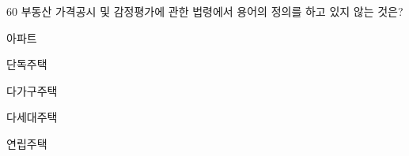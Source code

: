 \begin{question}{60}
부동산 가격공시 및 감정평가에 관한 법령에서 용어의 정의를 하고 있지 않는 것은?
\begin{choices}
  \item 아파트
  \item 단독주택
  \item 다가구주택
  \item 다세대주택
  \item 연립주택
\end{choices}
\end{question}
